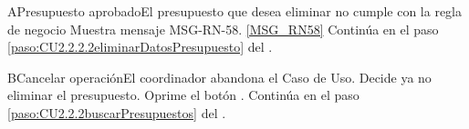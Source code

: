 		
		\begin{UCtrayectoriaA}{A}{Presupuesto aprobado}{El presupuesto que desea eliminar no cumple con la regla de negocio }
			\UCpaso Muestra mensaje  {MSG-RN-58}. \ref{MSG_RN58}
			\UCpaso Continúa en el paso \ref{paso:CU2.2.2.2eliminarDatosPresupuesto} del .
		\end{UCtrayectoriaA}%
		\begin{UCtrayectoriaA}{B}{Cancelar operación}{El coordinador abandona el Caso de Uso.}
			\UCpaso[\UCactor] Decide ya no eliminar el presupuesto.
			\UCpaso[\UCactor] Oprime el botón .
			\UCpaso Continúa en el paso \ref{paso:CU2.2.2buscarPresupuestos} del .
		\end{UCtrayectoriaA}
